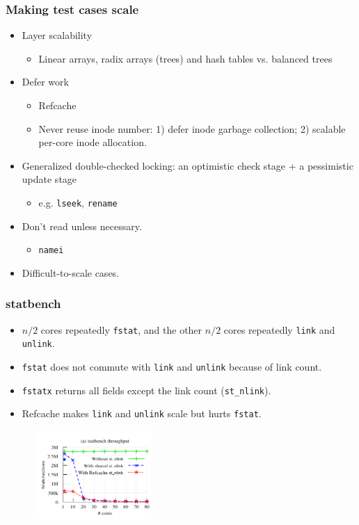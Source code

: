 \documentclass{beamer}
\begin{document}
\begin{frame}
\frametitle{Making test cases scale}
\begin{itemize}

\item Layer scalability
\begin{itemize}
\item Linear arrays, radix arrays (trees) and hash tables vs. balanced trees
\end{itemize}
\item Defer work
\begin{itemize}
\item Refcache
\item Never reuse inode number: 1) defer inode garbage collection;
2) scalable per-core inode allocation.
\end{itemize}

\item Generalized double-checked locking: an optimistic check stage + a 
  pessimistic update stage
\begin{itemize}
\item e.g. \texttt{lseek}, \texttt{rename}
\end{itemize}

\item Don't read unless necessary.
\begin{itemize}
\item \texttt{namei}
\end{itemize}

\item Difficult-to-scale cases.

\end{itemize}
 
\end{frame}

\begin{frame}
\frametitle{statbench}
\begin{itemize}
\item $n/2$ cores repeatedly \texttt{fstat}, and the other $n/2$ cores 
  repeatedly \texttt{link} and \texttt{unlink}.
\item \texttt{fstat} does not commute with \texttt{link} and \texttt{unlink} 
  because of link count.
\item \texttt{fstatx} returns all fields except the link count (\texttt{st\_nlink}).
\item Refcache makes \texttt{link} and \texttt{unlink} scale but hurts
\texttt{fstat}.
\end{itemize}

\begin{figure}
   \includegraphics[width=0.4\textwidth]{799-s14-docs/statbench.png}
 \end{figure}

\end{frame}
\end{document}

